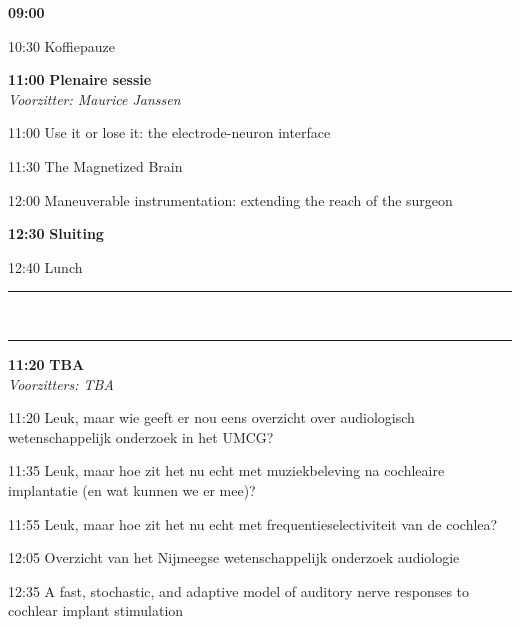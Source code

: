 \documentclass[a4paper,10pt]{report}
\begin{document}
\begin{multicols*}{3}
\columnbreak


\begin{packed_enum}
\item[{\color{Blue} {\textbf{09:00} }}]{ }
        \vfill
\item[10:30] Koffiepauze
        \vfill
\item[\textbf{11:00}] {\textbf{Plenaire sessie}}\\\textit{Voorzitter: Maurice Janssen}
\item[11:00] Use it or lose it: the electrode-neuron interface
\item[11:30] The Magnetized Brain
\item[12:00] Maneuverable instrumentation: extending the reach of the surgeon
        \vfill
\item[\textbf{12:30}] \textbf{Sluiting}
\item[12:40] Lunch
\end{packed_enum}%

\hrule %
\\
\hrule
\vspace{3mm}
\vfill

\begin{packed_enum}
\item[\textbf{11:20}] {\textbf{TBA}}\\\textit{Voorzitters: TBA}
\item[11:20] Leuk, maar wie geeft er nou eens overzicht over audiologisch wetenschappelijk onderzoek in het UMCG?
\item[11:35] Leuk, maar hoe zit het nu echt met muziekbeleving na cochleaire implantatie (en wat kunnen we er mee)?
\item[11:55] Leuk, maar hoe zit het nu echt met frequentieselectiviteit van de cochlea?
\item[12:05] Overzicht van het Nijmeegse wetenschappelijk onderzoek audiologie
\item[12:35] A fast, stochastic, and adaptive model of auditory nerve responses to cochlear implant stimulation
\end{packed_enum} %


\end{multicols*}
\end{document}
